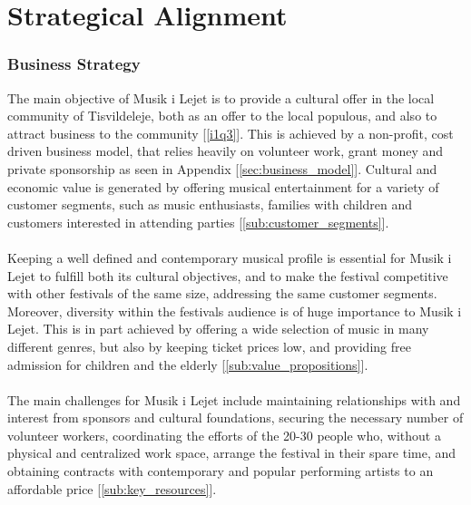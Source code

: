 \part{Strategical Alignment}

\section{Business Strategy}
The main objective of Musik i Lejet is to provide a cultural offer in the local community of Tisvildeleje, both as an offer to the local populous, and also to attract business to the community [\ref{i1q3}]. This is achieved by a non-profit, cost driven business model, that relies heavily on volunteer work, grant money and private sponsorship as seen in Appendix [\ref{sec:business_model}]. Cultural and economic value is generated by offering musical entertainment for a variety of customer segments, such as music enthusiasts, families with children and customers interested in attending parties [\ref{sub:customer_segments}].
\\ \\
Keeping a well defined and contemporary musical profile is essential for Musik i Lejet to fulfill both its cultural objectives, and to make the festival competitive with other festivals of the same size, addressing the same customer segments. Moreover, diversity within the festivals audience is of huge importance to Musik i Lejet. This is in part achieved by offering a wide selection of music in many different genres, but also by keeping ticket prices low, and providing free admission for children and the elderly [\ref{sub:value_propositions}].
\\ \\
The main challenges for Musik i Lejet include maintaining relationships with and interest from sponsors and cultural foundations, securing the necessary number of volunteer workers, coordinating the efforts of the 20-30 people who, without a physical and centralized work space, arrange the festival in their spare time, and obtaining contracts with contemporary and popular performing artists to an affordable price [\ref{sub:key_resources}].

